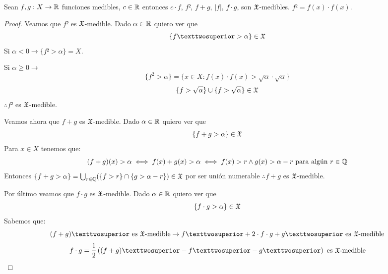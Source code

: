 \clearpage

\begin{lemma}
    Sean $f, g: X \to \mathbb{R}$ funciones medibles, $c \in \mathbb{R}$ entonces $c \cdot f$, $f²$, $f + g$, $|f|$, $f \cdot g$, son $\mathfrak{X}$-medibles.
    $f² = f(x) \cdot f(x)$.
    \begin{proof}
        Veamos que $f²$ es $\mathfrak{X}$-medible. Dado $\alpha \in \mathbb{R}$ quiero ver que \begin{equation*}
            \{ f² > \alpha \} \in \mf{X}
        \end{equation*}
        Si $\alpha < 0 \to \{ f² > \alpha \} = X$.

        Si $\alpha \geq 0 \to$
        \begin{equation*}
            \{ f^2 > \alpha \} = \{ x \in X : f(x) \cdot f(x) > \sqrt{\alpha} \cdot \sqrt{\alpha} \}
        \end{equation*}
        \begin{equation*}
            \{ f > \sqrt{\alpha} \} \cup \{ f > \sqrt{\alpha} \} \in \mathfrak{X}
        \end{equation*} $\therefore f²$ es $\mathfrak{X}$-medible.

        Veamos ahora que $f + g$ es $\mathfrak{X}$-medible. Dado $\alpha \in \mathbb{R}$ quiero ver que \begin{equation*}
            \{ f + g > \alpha \} \in \mathfrak{X}
        \end{equation*}
        Para $x \in X$ tenemos que: \begin{equation*}
            (f+g)(x) > \alpha \iff f(x) + g(x) > \alpha \iff f(x) > r \land g(x) > \alpha - r \text{ para algún } r \in \mathbb{Q}
        \end{equation*}
        Entonces $\{ f + g > \alpha \} = \bigcup_{r \in \mathbb{Q}} (\{ f > r \} \cap \{ g > \alpha - r \}) \in \mathfrak{X}$ por ser unión numerable $\therefore f+g$ es $\mathfrak{X}$-medible.

        Por último veamos que $f \cdot g$ es $\mathfrak{X}$-medible. Dado $\alpha \in \mathbb{R}$ quiero ver que \begin{equation*}
            \{ f \cdot g > \alpha \} \in \mathfrak{X}
        \end{equation*}
        Sabemos que:
        \begin{equation*}
            (f+g)² \text{ es } \mf{X} \text{-medible} \to f² + 2 \cdot f \cdot g + g² \text{ es } \mf{X} \text{-medible}
        \end{equation*}
        \begin{equation*}
            f \cdot g = \frac{1}{2} \left( (f+g)² - f² - g² \right) \text{ es } \mf{X} \text{-medible}
        \end{equation*}
    \end{proof}
\end{lemma}

